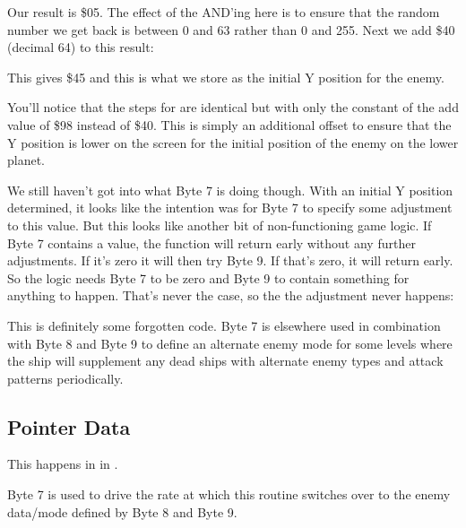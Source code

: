 Our result is \$05. The effect of the AND'ing here is to ensure that the random number we get back is between 0 and 63 rather
than 0 and 255. Next we add \$40 (decimal 64) to this result:

%


This gives \$45 and this is what we store as the initial Y position for the enemy.

You'll notice that the steps for  are identical but with only the constant of the
add value of \$98 instead of \$40. This is simply an additional offset to ensure that the Y position is lower on the screen
for the initial position of the enemy on the lower planet.

We still haven't got into what Byte 7 is doing though. With an initial Y position determined, it looks like the intention was
for Byte 7 to specify some adjustment to this value. But this looks like another bit of non-functioning game logic. If
Byte 7 contains a value, the function will return early without any further adjustments. If it's zero it will then try
Byte 9. If that's zero, it will return early. So the logic needs Byte 7 to be zero and Byte 9 to contain something for 
anything to happen. That's never the case, so the the adjustment never happens:

%


This is definitely some forgotten code. Byte 7 is elsewhere used in combination with Byte 8 and Byte 9 to define an alternate
enemy mode for some levels where the ship will supplement any dead ships with alternate enemy types and attack patterns periodically.


\subsection{Pointer Data}
This happens in  in . 

%


Byte 7 is used to drive the rate at which this routine switches over to the enemy data/mode defined by Byte 8 and Byte 9.

